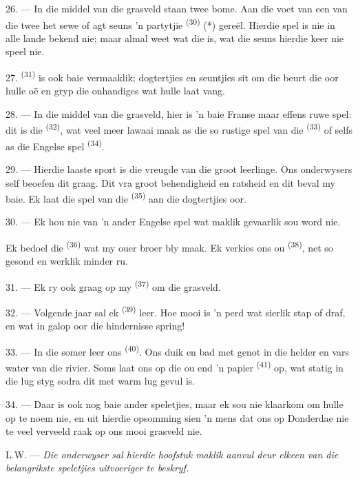 26. --- In die middel van die grasveld staan twee bome. Aan die voet van een van die
twee het sewe of agt seuns 'n partytjie \textsuperscript{(30)} (*)
gereël. Hierdie spel is nie in alle lande bekend nie; maar almal weet wat die
 is, wat die seuns hierdie keer nie speel nie.

\VUsaut{5.0mm}
\VUsaut{3.4mm}

27. \textsuperscript{(31)} is ook baie vermaaklik; dogtertjies en
seuntjies sit om die beurt die  oor hulle oë en gryp die onhandiges
wat hulle laat vang.

28. --- In die middel van die grasveld, hier is 'n baie Franse maar effens ruwe spel:
dit is die \textsuperscript{(32)}, wat veel meer lawaai maak as die so
rustige spel van die \textsuperscript{(33)} of selfs as die Engelse spel
\textsuperscript{(34)}.

29. --- Hierdie laaste sport is die vreugde van die groot leerlinge. Ons onderwysers
self beoefen dit graag. Dit vra groot behendigheid en ratsheid en dit beval my baie.
Ek laat die spel van die \textsuperscript{(35)} aan die dogtertjies oor.

30. --- Ek hou nie van 'n ander Engelse spel wat maklik gevaarlik sou word nie.

Ek bedoel die \textsuperscript{(36)} wat my ouer broer bly maak. Ek
verkies ons ou \textsuperscript{(38)}, net so gesond en werklik
minder ru.

\VUsaut{4.6mm}
\VUsaut{3.0mm}

31. --- Ek ry ook graag op my \textsuperscript{(37)} om die grasveld.

32. --- Volgende jaar sal ek \textsuperscript{(39)} leer. Hoe mooi is 'n
perd wat sierlik stap of draf, en wat in galop oor die hindernisse spring!

33. --- In die somer leer ons \textsuperscript{(40)}. Ons duik en bad met
genot in die helder en vars water van die rivier. Soms laat ons op die ou end 'n papier
\textsuperscript{(41)} op, wat statig in die lug styg sodra dit met warm
lug gevul is.

34. --- Daar is ook nog baie ander speletjies, maar ek sou nie klaarkom om hulle op te
noem nie, en uit hierdie opsomming sien 'n mens dat ons op Donderdae nie te veel verveeld
raak op ons mooi grasveld nie.

L.W. --- \textit{Die onderwyser sal hierdie hoofstuk maklik aanvul deur elkeen van die
belangrikste speletjies uitvoeriger te beskryf.}
